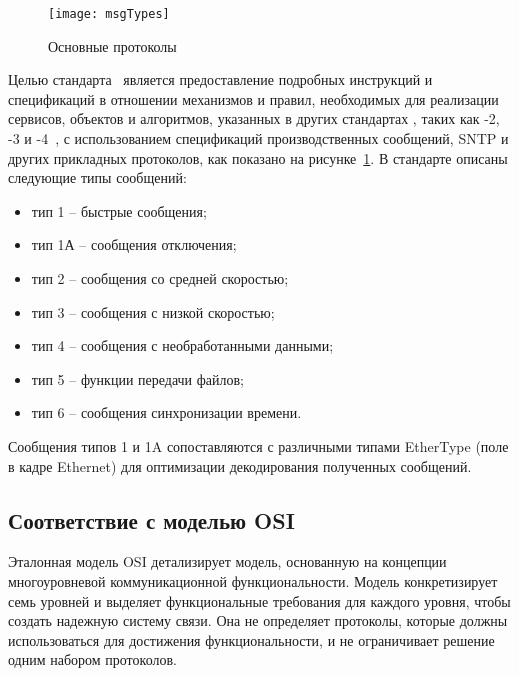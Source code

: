 \begin{figure}[ht]
    \centering
    \texttt{[image: msgTypes]}
    \caption{Основные протоколы \iecStd}
    \label{pic::domain::msg_types}
\end{figure}

Целью стандарта \ является предоставление подробных
инструкций и
спецификаций в отношении механизмов и правил, необходимых для реализации сервисов,
объектов и алгоритмов, указанных в других стандартах \iec, таких как
-2, -3 и -4~\cite{IEC61850_7_2, IEC61850_7_3,
IEC61850_7_4}, с использованием спецификаций производственных сообщений,
SNTP и других прикладных протоколов, как показано
на рисунке~\ref{pic::domain::msg_types}.
В стандарте описаны следующие типы сообщений:

\begin{itemize}
    \item тип 1 -- быстрые сообщения;
    \item тип 1А -- сообщения отключения;
    \item тип 2 -- сообщения со средней скоростью;
    \item тип 3 -- сообщения с низкой скоростью;
    \item тип 4 -- сообщения с необработанными данными;
    \item тип 5 -- функции передачи файлов;
    \item тип 6 -- сообщения синхронизации времени.
\end{itemize}


Сообщения типов 1 и 1A сопоставляются с различными типами EtherType
(поле в кадре Ethernet) для оптимизации декодирования полученных сообщений.

\subsection{Соответствие с моделью OSI}


Эталонная модель OSI детализирует модель, основанную на концепции многоуровневой
коммуникационной функциональности. Модель конкретизирует семь уровней и выделяет
функциональные требования для каждого уровня, чтобы создать надежную систему связи.
Она не определяет протоколы, которые должны использоваться для достижения
функциональности, и не ограничивает решение одним набором протоколов.

